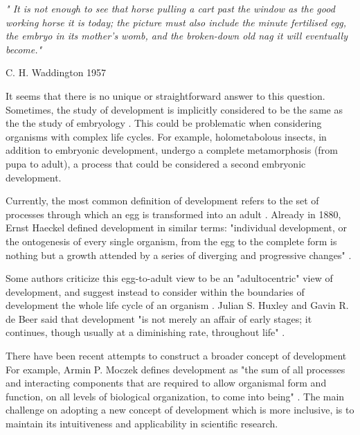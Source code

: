 \setlength{\epigraphrule}{0\p@}
\setlength{\epigraphwidth}{.7\textwidth}
\epigraph{\textit{" It is not enough to see that horse pulling a cart past
the window as the good working horse it is today; the picture
must also include the minute fertilised egg, the embryo in its
mother's womb, and the broken-down old nag it will eventually
become."}}{C. H. Waddington 1957}

It seems that there is no unique or straightforward answer to this question.
Sometimes, the study of development is implicitly considered to be the same as the the study of embryology \citep{Horder2010}.
This could be problematic when considering organisms with complex life cycles. For example, holometabolous insects, in addition to embryonic development, undergo a complete metamorphosis (from pupa to adult), a process that could be considered a second embryonic development.

Currently, the most common definition of development refers to the set of processes through which an egg is transformed into an adult \citep{Horder2010,Minelli2011}.
Already in 1880, Ernst Haeckel defined development in similar terms: "individual development, or the ontogenesis of every single organism, from the egg to the complete form is nothing but a growth attended by a series of diverging and progressive changes" \citep{haeckel_historycreation1880}.

Some authors criticize this egg-to-adult view to be an "adultocentric" view of development, and suggest instead to consider within the boundaries of development the whole life cycle of an organism \citep{Gilbert2011,Minelli2011}.
Julian S. Huxley and Gavin R. de Beer said that development "is not merely an affair of early stages; it continues, though usually at a diminishing rate, throughout life" \citep{huxley1963elements}.


There have been recent attempts to construct a broader concept of development \citep{Griesemer2014,Moczek2014,Pradeu2014} For example, Armin P. Moczek defines development as "the sum of all processes and interacting components that are required to allow organismal form and function, on all levels of biological organization, to come into being" \citep{Moczek2014}.
%
The main challenge on adopting a new concept of development which is more inclusive, is to maintain its intuitiveness and applicability in scientific research.

